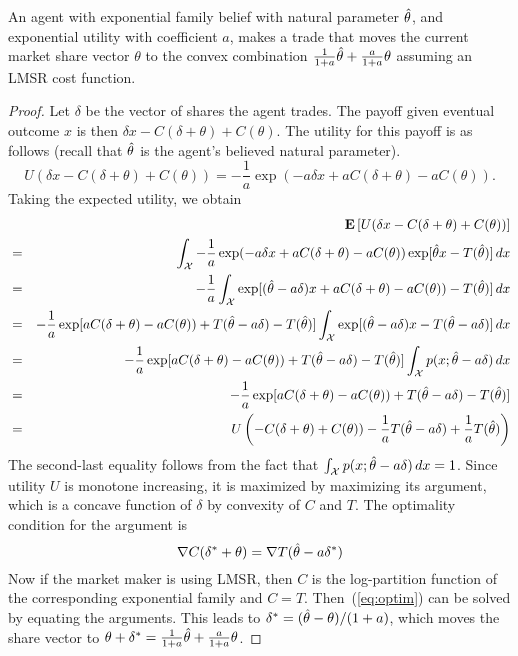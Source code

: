 %
\begin{proposition}
An agent with exponential family belief with natural parameter $\hat{\theta}$, and exponential utility with coefficient $a$, makes a trade that moves the current market share vector $\theta$ to the convex combination $\frac{1}{1+a} \hat{\theta} + \frac{a}{1+a} \theta$ assuming an LMSR cost function.
\end{proposition}
%
%
\begin{proof}
Let $\delta$ be the vector of shares the agent trades. The payoff given eventual outcome $x$ is then $\delta x - C(\delta + \theta) + C(\theta)$. The utility for this payoff is as follows (recall that $\hat{\theta}$ is the agent's believed natural parameter).
%
\[ U( \delta x - C(\delta + \theta) + C(\theta) ) = -\frac{1}{a} \exp(-a \delta x + a C(\delta + \theta) - a C(\theta)).
\]
%
Taking the expected utility, we obtain
%
\begin{eqnarray*}
&   & \mathbf{E}\left[ U( \delta x - C(\delta + \theta) + C(\theta) ) \right] \\
& = & \int_{\mathcal{X}} -\frac{1}{a} \exp(-a \delta x + a C(\delta + \theta) - a C(\theta)) \exp[\hat{\theta} x - T(\hat{\theta})]\, dx \\
& = & -\frac{1}{a} \int_{\mathcal{X}} \exp[(\hat{\theta} -a \delta) x + a C(\delta + \theta) - a C(\theta)) - T(\hat{\theta})]\, dx \\
& = & -\frac{1}{a} \exp[a C(\delta + \theta) - a C(\theta)) + T(\hat{\theta} - a\delta) - T(\hat{\theta})] \int_{\mathcal{X}} \exp[(\hat{\theta} -a \delta) x - T(\hat{\theta} -a \delta)]\, dx \\
& = & -\frac{1}{a} \exp[a C(\delta + \theta) - a C(\theta)) + T(\hat{\theta} - a\delta) - T(\hat{\theta})] \int_{\mathcal{X}} p(x; \hat{\theta} -a \delta)\, dx \\
& = & -\frac{1}{a} \exp[a C(\delta + \theta) - a C(\theta)) + T(\hat{\theta} - a\delta) - T(\hat{\theta})]\\
& = & U\left(- C(\delta + \theta) + C(\theta)) - \frac{1}{a} T(\hat{\theta} - a\delta) + \frac{1}{a} T(\hat{\theta})\right)
\end{eqnarray*}
%
The second-last equality follows from the fact that $\int_{\mathcal{X}} p(x; \hat{\theta} -a \delta)\, dx = 1$. Since utility $U$ is monotone increasing, it is maximized by maximizing its argument, which is a concave function of $\delta$ by convexity of $C$ and $T$. The optimality condition for the argument is
%
\begin{equation} \label{eq:optim}
\nabla C(\delta^* + \theta) = \nabla T(\hat{\theta} - a\delta^*)
\end{equation}
%
Now if the market maker is using LMSR, then $C$ is the log-partition function of the corresponding exponential family and $C = T$. Then~(\ref{eq:optim}) can be solved by equating the arguments. This leads to $\delta^* = (\hat{\theta} - \theta) / (1+a)$, which moves the share vector to $\theta + \delta^* = \frac{1}{1+a} \hat{\theta} + \frac{a}{1+a} \theta$.
\end{proof}
%

